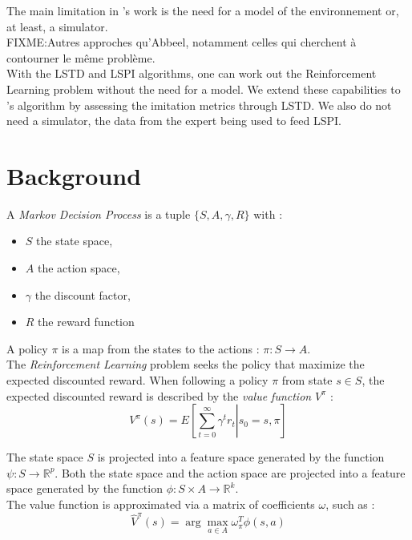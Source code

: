 \documentclass{article}
\begin{document}
The main limitation in \citet{abbeel2004apprenticeship}'s work is the need for a model of the environnement or, at least, a simulator. \\

FIXME:Autres approches qu'Abbeel, notamment celles qui cherchent à contourner le même problème.\\

With the LSTD \citep{bradtke1996linear} and LSPI \citep{lagoudakis2003least} algorithms, one can work out the Reinforcement Learning problem without the need for a model. We extend these capabilities to \citet{abbeel2004apprenticeship}'s algorithm by assessing the imitation metrics through LSTD. We also do not need a simulator, the data from the expert being used to feed LSPI.\\
\section{Background}
A \emph{Markov Decision Process} is a tuple $\{S,A,\gamma,R\}$ with :
\begin{itemize}
\item $S$ the state space,
\item $A$ the action space,
\item $\gamma$ the discount factor,
\item $R$ the reward function
\end{itemize}

A policy $\pi$ is a map from the states to the actions : $\pi:S\rightarrow A$.\\

The \emph{Reinforcement Learning} problem seeks the policy that maximize the expected discounted reward. When following a policy $\pi$ from state $s\in S$, the expected discounted reward is described by the \emph{value function} $V^\pi$ : \\
\begin{equation}
V^\pi(s) = E\left[\left.\sum\limits_{t=0}^{\infty}\gamma^tr_t\right|s_0=s,\pi\right]
\label{eqn:V}
\end{equation}

The state space $S$ is projected into a feature space generated by the function $\psi : S \rightarrow \mathbb{R}^p$. Both the state space and the action space are projected into a feature space generated by the function $\phi : S\times A \rightarrow \mathbb{R}^k$.\\

The value function is approximated via a matrix of coefficients $\omega$, such as :
\begin{equation}
\hat V^\pi(s) = \arg\max_{a\in A}\omega_\pi^T\phi(s,a)
\end{equation}
\end{document}

